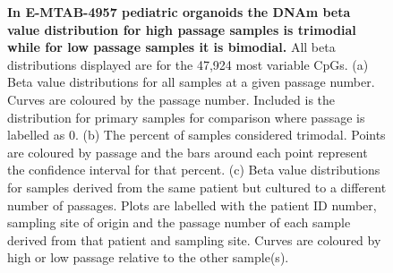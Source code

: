 \documentclass[a4paper]{article}
\begin{document}
\begin{figure}
\begin{flushleft}
\caption{\textbf{In E-MTAB-4957 pediatric organoids the DNAm beta value distribution for high passage samples is trimodial while for low passage samples it is bimodial.} All beta distributions displayed are for the 47,924 most variable CpGs. (a) Beta value distributions for all samples at a given passage number. Curves are coloured by the passage number. Included is the distribution for primary samples for comparison where passage is labelled as 0. (b) The percent of samples considered trimodal. Points are coloured by passage and the bars around each point represent the confidence interval for that percent. (c) Beta value distributions for samples derived from the same patient but cultured to a different number of passages. Plots are labelled with the patient ID number, sampling site of origin and the passage number of each sample derived from that patient and sampling site. Curves are coloured by high or low passage relative to the other sample(s).}
\label{fig:main}
\end{flushleft}
\end{figure}
\end{document}
